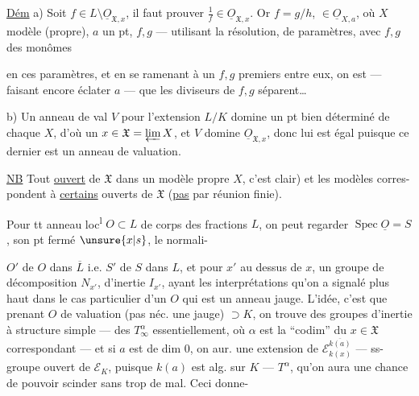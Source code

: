 \uline{Dém} a) Soit $f\in L\setminus\underline{O}_{\mathfrak X,x}$, il faut prouver $\frac1f\in\underline{O}_{\mathfrak X,x}$. Or $f=g/h$, $\in\underline{O}_{X,a}$, où $X$ modèle  (propre), $a$ un pt, $f,g$  --- utilisant la résolution,   de paramètres, avec $f,g$ des monômes


en ces paramètres, et en se ramenant à un $f,g$ premiers entre eux, on est --- faisant encore éclater $a$ --- que les diviseurs de $f,g$  séparent\ldots

b) Un anneau de val $V$  pour l'extension $L/K$ domine un pt bien déterminé  de chaque $X$, d'où un $x\in\mathfrak X=\varprojlim X$, et $V$ domine $\underline{O}_{\mathfrak X,x}$, donc lui est égal puisque ce dernier est un anneau de valuation.

\uline{NB} Tout  \uline{ouvert} de $\mathfrak X$    dans un modèle propre $X$, c'est clair) et  les modèles corres-\\
pondent à \uline{certains} ouverts de $\mathfrak X$ (\uline{pas}  par réunion finie).

Pour tt anneau loc\textsuperscript{l}  $O\subset L$ de corps des fractions $L$, on peut regarder $\operatorname{Spec}\underline{O}=S$, son pt fermé $\unsure{x|s}$, le normali-


$O'$ de $O$ dans $\overline L$ i.e. $S'$ de $S$ dans $L$, et pour $x'$ au dessus de $x$, un groupe de décomposition $N_{x'}$, d'inertie $I_{x'}$, ayant les interprétations qu'on a signalé plus haut dans le cas particulier d'un $O$ qui est un anneau jauge. L'idée, c'est que prenant $O$ de valuation (pas néc. une jauge) $\supset K$, on trouve des groupes d'inertie à structure simple ---
des $T_\infty^\alpha$ essentiellement, où $\alpha$ est la ``codim'' du $x\in\mathfrak X$ correspondant --- et si $a$ est de dim $0$, on aur. une extension de $\mathcal E_{k(x)}^{\overline{k(a)}}$ --- ss-groupe ouvert de $\mathcal E_K$, puisque
$k(a)$ est  alg. sur $K$ ---  $T^\alpha$, qu'on aura une chance de pouvoir scinder sans trop de mal. Ceci donne-

